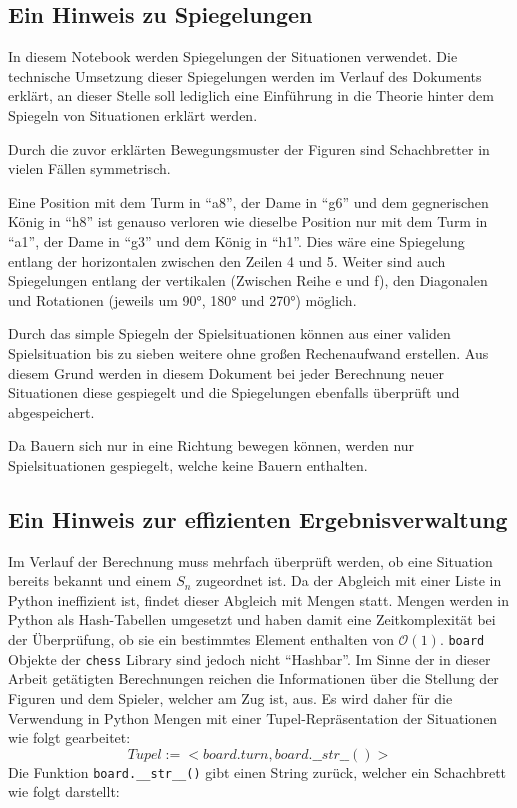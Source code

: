 \documentclass[12pt]{article}
\begin{document}
    \hypertarget{ein-hinweis-zu-spiegelungen}{%
\subsection{Ein Hinweis zu
Spiegelungen}\label{ein-hinweis-zu-spiegelungen}}

In diesem Notebook werden Spiegelungen der Situationen verwendet. Die
technische Umsetzung dieser Spiegelungen werden im Verlauf des Dokuments
erklärt, an dieser Stelle soll lediglich eine Einführung in die Theorie
hinter dem Spiegeln von Situationen erklärt werden.

Durch die zuvor erklärten Bewegungsmuster der Figuren sind Schachbretter
in vielen Fällen symmetrisch.

Eine Position mit dem Turm in ``a8'', der Dame in ``g6'' und dem
gegnerischen König in ``h8'' ist genauso verloren wie dieselbe Position
nur mit dem Turm in ``a1'', der Dame in ``g3'' und dem König in ``h1''.
Dies wäre eine Spiegelung entlang der horizontalen zwischen den Zeilen 4
und 5. Weiter sind auch Spiegelungen entlang der vertikalen (Zwischen
Reihe e und f), den Diagonalen und Rotationen (jeweils um 90°, 180° und
270°) möglich.

Durch das simple Spiegeln der Spielsituationen können aus einer validen
Spielsituation bis zu sieben weitere ohne großen Rechenaufwand
erstellen. Aus diesem Grund werden in diesem Dokument bei jeder
Berechnung neuer Situationen diese gespiegelt und die Spiegelungen
ebenfalls überprüft und abgespeichert.

Da Bauern sich nur in eine Richtung bewegen können, werden nur
Spielsituationen gespiegelt, welche keine Bauern enthalten.

    \hypertarget{ein-hinweis-zur-effizienten-ergebnisverwaltung}{%
\subsection{Ein Hinweis zur effizienten
Ergebnisverwaltung}\label{ein-hinweis-zur-effizienten-ergebnisverwaltung}}

Im Verlauf der Berechnung muss mehrfach überprüft werden, ob eine
Situation bereits bekannt und einem \(S_n\) zugeordnet ist. Da der
Abgleich mit einer Liste in Python ineffizient ist, findet dieser
Abgleich mit Mengen statt. Mengen werden in Python als Hash-Tabellen
umgesetzt und haben damit eine Zeitkomplexität bei der Überprüfung, ob
sie ein bestimmtes Element enthalten von \(\mathcal{O}(1)\).
\texttt{board} Objekte der \texttt{chess} Library sind jedoch nicht
``Hashbar''. Im Sinne der in dieser Arbeit getätigten Berechnungen
reichen die Informationen über die Stellung der Figuren und dem Spieler,
welcher am Zug ist, aus. Es wird daher für die Verwendung in Python
Mengen mit einer Tupel-Repräsentation der Situationen wie folgt
gearbeitet: \[
Tupel := <board.turn, board.\_\_str\_\_()>
\] Die Funktion \texttt{board.\_\_str\_\_()} gibt einen String zurück,
welcher ein Schachbrett wie folgt darstellt:
\end{document}
